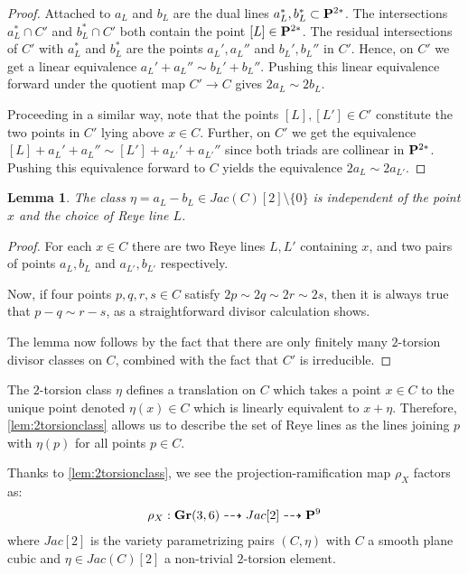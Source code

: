 \documentclass[11pt,reqno]{amsart}
\theoremstyle{plain}
\newtheorem{lemma}[theorem]{Lemma}
\theoremstyle{definition}
\theoremstyle{remark}
\numberwithin{equation}{section}
\renewcommand{\to}{{\longrightarrow}}
\numberwithin{equation}{section}
\begin{document}
\begin{proof}
  Attached to $a_{L}$ and $b_{L}$ are the dual lines $a_{L}^{*}, b_{L}^{*} \subset \P^{2*}$. The intersections $a_{L}^{*} \cap C'$ and $b_{L}^{*} \cap C'$ both contain the point $[L] \in \P^{2*}$. The residual intersections of $C'$ with $a_{L}^{*}$ and $b_{L}^{*}$ are the points $a_{L}', a_{L}''$ and $b_{L}', b_{L}''$ in $C'$. Hence, on $C'$ we get a linear equivalence $a_{L}'+ a_{L}'' \sim b_{L}' +  b_{L}''$. Pushing this linear equivalence forward under the quotient map $C' \to C$ gives $2a_{L} \sim 2b_{L}$. 

  Proceeding in a similar way, note that the points $[L], [L'] \in C'$ constitute the two points in $C'$ lying above $x \in C$. Further, on $C'$ we get the equivalence $[L] + a_{L}'+ a_{L}'' \sim [L'] + a_{L'}'+ a_{L'}''$ since both triads are collinear in $\P^{2*}$.  Pushing this equivalence forward to $C$ yields the equivalence $2a_{L} \sim 2a_{L'}.$ 
\end{proof}




\begin{lemma}
  \label{lem:2torsionclass}
  The class $\eta = a_{L}-b_{L} \in Jac(C)[2] \setminus \{0\}$ is independent of the point $x$ and the choice of Reye line $L$.
\end{lemma}
\begin{proof}
  For each $x \in C$ there are two Reye lines $L,L'$ containing $x$, and two pairs of points $a_{L},b_{L}$ and $a_{L'},b_{L'}$ respectively. 

  Now, if four points $p,q,r,s \in C$ satisfy $2p \sim 2q \sim 2r \sim 2s$, then it is always true that $p-q 
  \sim r-s$, as a straightforward divisor calculation shows. 

  The lemma now follows by the fact that there are only finitely many $2$-torsion divisor classes on $C$, combined with the fact that $C'$ is irreducible.
\end{proof}


The $2$-torsion class $\eta$ defines a translation on $C$ which takes a point $x \in C$ to the unique point denoted $\eta(x) \in C$ which is linearly equivalent to $x + \eta$. Therefore, \autoref{lem:2torsionclass} allows us to describe the set of Reye lines as the lines joining $p$ with $\eta(p)$ for all points $p \in C$.  




Thanks to \autoref{lem:2torsionclass}, we see the projection-ramification map $\rho_{X}$ factors as: 
\begin{align}\label{eq:compose}
  \rho_{X}: \Gr(3,6) \dashrightarrow Jac[2] \dashrightarrow \P^{9}
\end{align}
where $Jac[2]$ is the variety parametrizing pairs $(C,\eta)$ with $C$ a smooth plane cubic and $\eta \in Jac(C)[2]$ a non-trivial $2$-torsion element. 
\end{document}
